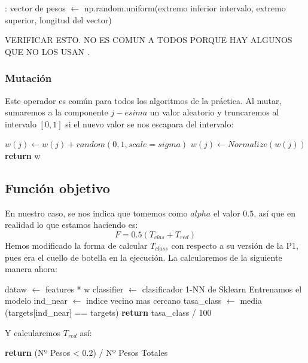 \documentclass[10pt, a4paper]{article}
\theoremstyle{theorem-style}
\theoremstyle{theorem-style}
\theoremstyle{theorem2-style}
\theoremstyle{definition-style}
\theoremstyle{remark-style}
\theoremstyle{example-style}
\theoremstyle{definition-style}
\theoremstyle{remark-style}
\theoremstyle{remark-style}
\begin{document}
\begin{algorithmic}[1]
:
\State vector de pesos $\gets$ np.random.uniform(extremo inferior intervalo, extremo superior, longitud del vector)
\EndProcedure
\end{algorithmic}

VERIFICAR ESTO. NO ES COMUN A TODOS PORQUE HAY ALGUNOS QUE NO LOS USAN .

\subsubsection{\textcolor{ugrColor}{Mutación}}
Este operador es común para todos los algoritmos de la práctica. Al mutar, sumaremos a la componente $j-esima$ un valor aleatorio y truncaremos al intervalo $[0,1]$ si el nuevo valor se nos escapara del intervalo:\\
\begin{algorithmic}[1]
\State $w(j) \gets w(j) + random(0,1, scale = sigma)$
\State $w(j) \gets Normalize(w(j))$
\State \textbf{return} w
\EndProcedure
\end{algorithmic}

\subsection{Función objetivo}
En nuestro caso, se nos indica que tomemos como $alpha$ el valor $0.5$, así que en realidad lo que estamos haciendo es:
\[
F = 0.5(T_{clas} + T_{red})
\]
Hemos modificado la forma de calcular  $T_{class}$ con respecto a su versión de la P1, pues era el cuello de botella en la ejecución. La calcularemos de la siguiente manera ahora:\\

\begin{algorithmic}[1]
\State dataw $\gets$ features * w
\State classifier $\gets$ clasificador 1-NN de Sklearn
\State Entrenamos el modelo
\State ind\_near $\gets$ indice vecino mas cercano
\State tasa\_class $\gets$ media (targets[ind\_near] == targets)
\State \textbf{return} tasa\_class / 100

\EndProcedure
\end{algorithmic}

Y calcularemos $T_{red}$ así:\\
\begin{algorithmic}[1]
\State \textbf{return} (Nº Pesos < 0.2) / Nº Pesos Totales
\EndProcedure
\end{algorithmic}
\end{document}
